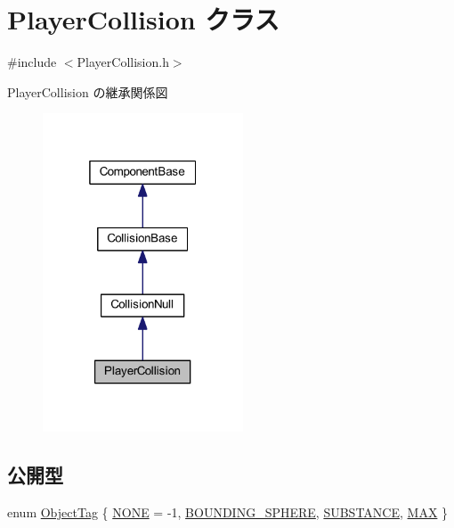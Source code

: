 \hypertarget{class_player_collision}{}\section{Player\+Collision クラス}
\label{class_player_collision}


{\ttfamily \#include $<$Player\+Collision.\+h$>$}



Player\+Collision の継承関係図\nopagebreak
\begin{figure}[H]
\begin{center}
\leavevmode
\includegraphics[width=169pt]{class_player_collision__inherit__graph}
\end{center}
\end{figure}
\subsection*{公開型}
\begin{DoxyCompactItemize}
\item 
enum \mbox{\hyperlink{class_player_collision_a628e8898ff4fc1f85eb4ba44eb0a6907}{Object\+Tag}} \{ \mbox{\hyperlink{class_player_collision_a628e8898ff4fc1f85eb4ba44eb0a6907abde9854e7cb5dd2906a4f5e7ca3a896d}{N\+O\+NE}} = -\/1, 
\mbox{\hyperlink{class_player_collision_a628e8898ff4fc1f85eb4ba44eb0a6907ae8cec799ba827b372f0d4bedec1b9bbb}{B\+O\+U\+N\+D\+I\+N\+G\+\_\+\+S\+P\+H\+E\+RE}}, 
\mbox{\hyperlink{class_player_collision_a628e8898ff4fc1f85eb4ba44eb0a6907a1bdf29253670ff99684ddff916536360}{S\+U\+B\+S\+T\+A\+N\+CE}}, 
\mbox{\hyperlink{class_player_collision_a628e8898ff4fc1f85eb4ba44eb0a6907aa9f8cab198da5574b7a22acc4ecd42d5}{M\+AX}}
 \}
\end{DoxyCompactItemize}
